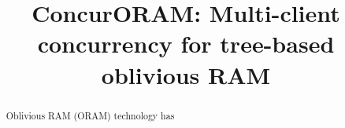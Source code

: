 \documentclass{acm}
\title{ConcurORAM: Multi-client concurrency for tree-based oblivious RAM}
\begin{document}
\maketitle
\begin{abstract}
 Oblivious RAM (ORAM) technology has 
 
\end{abstract}






\end{document}
